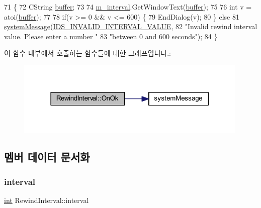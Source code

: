 \begin{DoxyCode}
71 \{
72   CString \mbox{\hyperlink{_g_b_a_8cpp_a28d4d3d8445e73a696b2d6f7eadabd96}{buffer}};
73 
74   \mbox{\hyperlink{class_rewind_interval_a67355ee1278bb5827beca804a2e2fcb5}{m\_interval}}.GetWindowText(\mbox{\hyperlink{_g_b_a_8cpp_a28d4d3d8445e73a696b2d6f7eadabd96}{buffer}});
75 
76   \textcolor{keywordtype}{int} v = atoi(\mbox{\hyperlink{_g_b_a_8cpp_a28d4d3d8445e73a696b2d6f7eadabd96}{buffer}});
77 
78   \textcolor{keywordflow}{if}(v >= 0 && v <= 600) \{
79     EndDialog(v);
80   \} \textcolor{keywordflow}{else}
81     \mbox{\hyperlink{system_8cpp_a747a9cb8e015a3d45cca636b5bd0fc69}{systemMessage}}(\mbox{\hyperlink{resource_8h_a63f354929dba5bb87a95dd54b96b6c93}{IDS\_INVALID\_INTERVAL\_VALUE}}, 
82                   \textcolor{stringliteral}{"Invalid rewind interval value. Please enter a number "}
83                   \textcolor{stringliteral}{"between 0 and 600 seconds"});
84 \}
\end{DoxyCode}
이 함수 내부에서 호출하는 함수들에 대한 그래프입니다.\+:
\nopagebreak
\begin{figure}[H]
\begin{center}
\leavevmode
\includegraphics[width=315pt]{class_rewind_interval_a1375930198e073532314da8b6ed40286_cgraph}
\end{center}
\end{figure}


\subsection{멤버 데이터 문서화}
\mbox{\label{class_rewind_interval_a3bf155d8d02f9b48cfb2c521fbd05c10}} 
\subsubsection{\texorpdfstring{interval}{interval}}
{\footnotesize\ttfamily \mbox{\hyperlink{_util_8cpp_a0ef32aa8672df19503a49fab2d0c8071}{int}} Rewind\+Interval\+::interval}



